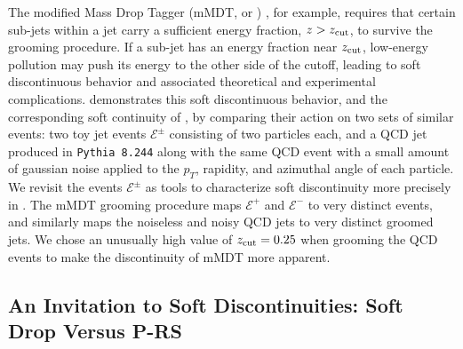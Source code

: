 The modified Mass Drop Tagger (mMDT, or ) \cite{Dasgupta:2013ihk,Larkoski:2014wba}, for example, requires that certain sub-jets within a jet carry a sufficient energy fraction, \(z > z_{\rm cut}\), to survive the grooming procedure.
%
If a sub-jet has an energy fraction near \(z_{\rm cut}\), low-energy pollution may push its energy to the other side of the cutoff, leading to soft discontinuous behavior and associated theoretical and experimental complications.
%
 demonstrates this soft discontinuous behavior, and the corresponding soft continuity of , by comparing their action on two sets of similar events:
%
two toy jet events \(\mathcal{E}^\pm\) consisting of two particles each, and a QCD jet produced in \texttt{Pythia 8.244} along with the same QCD event with a small amount of gaussian noise applied to the \(p_T\), rapidity, and azimuthal angle of each particle.
%
We revisit the events \(\mathcal{E}^\pm\) as tools to characterize soft discontinuity more precisely in .
%
The mMDT grooming procedure maps \(\mathcal{E}^+\) and \(\mathcal{E}^-\) to very distinct events, and similarly maps the noiseless and noisy QCD jets to very distinct groomed jets.
%
We chose an unusually high value of \(z_{\rm cut} = 0.25\) when grooming the QCD events to make the discontinuity of mMDT more apparent.
%

\subsection{An Invitation to Soft Discontinuities: Soft Drop Versus P-RS}
\label{sec:sd_discont}

